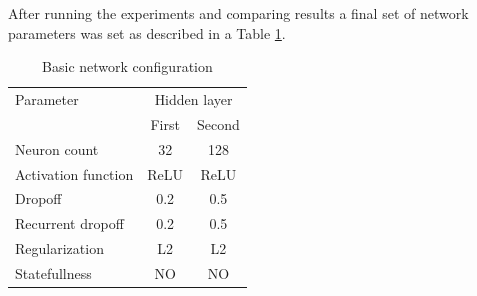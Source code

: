 \documentclass{article}
\begin{document}
After running the experiments and comparing results a final set of network parameters was set
as described in a Table \ref{tab:final_config}.
\begin{table}[htb] 
	\centering
	\caption{Basic network configuration}
	\label{tab:final_config}
	\begin{tabular}{lcc}
		\hline
		\hline
		Parameter& \multicolumn{2}{c}{Hidden layer}  \\
		&First&Second\\
		\hline
		Neuron count & 32 & 128  \\
		Activation function & ReLU & ReLU  \\
		Dropoff & 0.2 & 0.5   \\
		Recurrent dropoff & 0.2 & 0.5   \\
		Regularization & L2 & L2   \\
		Statefullness & NO & NO   \\
		\hline
		\hline
	\end{tabular}
\end{table}

\end{document}
